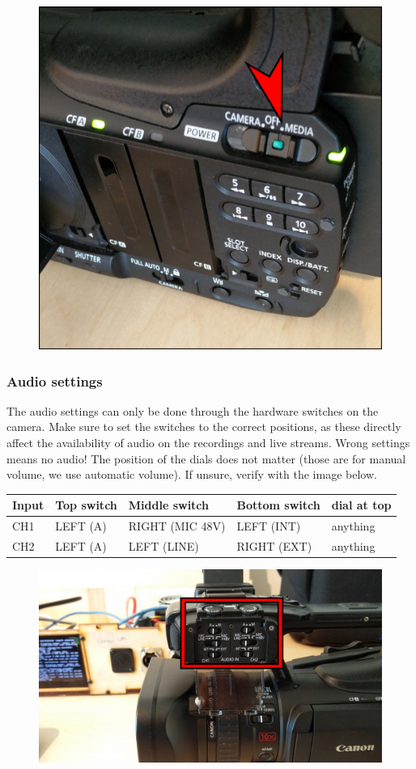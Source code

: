 \documentclass{article}
\begin{document}
\begin{figure}[H]
  \centering
\includegraphics[width = 120mm]{Canon03.jpg}
\end{figure}

\subsubsection{Audio settings}
The audio settings can only be done through the hardware switches on the camera.
Make sure to set the switches to the correct positions, as these directly affect the availability of audio on the recordings and live streams. Wrong settings means no audio!
The position of the dials does not matter (those are for manual volume, we use automatic volume).
If unsure, verify with the image below.

\begin{tabular}{| l || l | l | l | l |}
Input & Top switch & Middle switch & Bottom switch & dial at top \\ \hline
CH1 & LEFT (A) & RIGHT (MIC 48V) & LEFT (INT) & anything \\
CH2 & LEFT (A) & LEFT (LINE) & RIGHT (EXT) & anything \\
\end{tabular}

\begin{figure}[H]
  \centering
\includegraphics[width = 120mm]{Canon04.jpg}
\end{figure}
\end{document}
